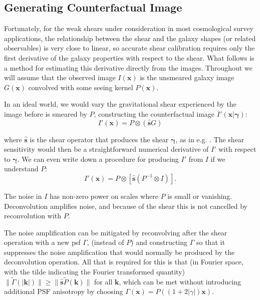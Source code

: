 \documentclass[iop]{emulateapj}
\begin{document}
\subsection{Generating Counterfactual Image}
Fortunately, for the weak shears under consideration in most cosmological survey applications, the relationship between the shear and the galaxy shapes (or related observables) is very close to linear, so accurate shear calibration requires only the first derivative of the galaxy properties with respect to the shear. What follows is a method for estimating this derivative directly from the images. Throughout we will assume that the observed image $I({\mathbf{x}})$ is the unsmeared galaxy image $G(\mathbf{x})$ convolved with some seeing kernel $P(\mathbf{x})$.

In an ideal world, we would vary the gravitational shear experienced by the image before is smeared by $P$, constructing the counterfactual image $I'(\mathbf{x}| {\boldsymbol \gamma})$:
\begin{equation}
  I'({\mathbf{x}}) = P \otimes\left( \hat{\mathbf{s}}G\right)
\end{equation}

where $\hat{\mathbf{s}}$ is the shear operator that produces the shear ${\boldsymbol \gamma}$, as in e.g. \cite{2002AJ....123..583B}. The shear sensitivity would then be a straightforward numerical derivative of $I'$ with respect to ${\boldsymbol \gamma}$. We can even write down a procedure for producing $I'$ from $I$ if we understand $P$:
\begin{equation}
  I'({\mathbf{x}}) = P \otimes \left[ \hat{\mathbf{s}}\left( P^{-1} \otimes I \right)\right].
\end{equation}

The noise in $I$ has non-zero power on scales where $P$ is small or vanishing. Deconvolution amplifies noise, and because of the shear this is not cancelled by reconvolution with $P$. 

The noise amplification can be mitigated by reconvolving after the shear operation with a new psf $\Gamma$, (instead of $P$) and constructing $\Gamma$ so that it suppresses the noise amplification that would normally be produced by the deconvolution operation. All that is required for this is that (in Fourier space, with the tilde indicating the Fourier transformed quantity) $\|\tilde{\Gamma}(\mathbf{|k|}) \| \geq \|\hat{\mathbf{s}} \tilde{P}(\mathbf{k})\|$ for all $\mathbf{k}$, which can be met without introducing additional PSF anisotropy by choosing $\Gamma(\mathbf{x}) = P\left((1+2|\gamma|)\mathbf{x}\right)$.
\end{document}
